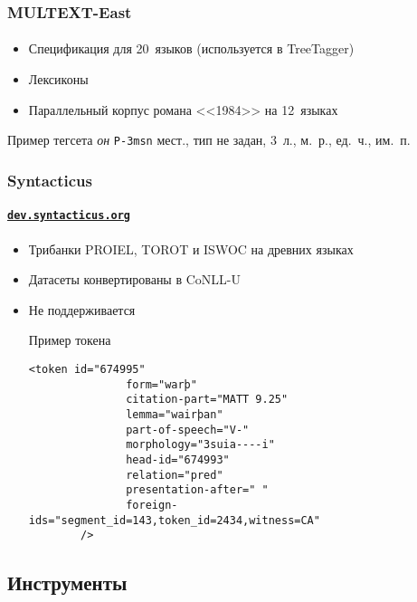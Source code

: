\begin{frame}
    \frametitle{MULTEXT-East}
    \framesubtitle{\autocite{multext_east}}

    \begin{itemize}
        \item Спецификация для 20~языков (используется в TreeTagger)
        \item Лексиконы
        \item Параллельный корпус романа <<1984>> на 12~языках
    \end{itemize}

    \vfill

    \begin{block}{Пример тегсета}
        \textit{он} \linebreak \texttt{P-3msn} \linebreak мест., тип не задан, 3~л., м.~р., ед.~ч., им.~п.
    \end{block}
\end{frame}

\begin{frame}[fragile]
    \frametitle{Syntacticus}
    \framesubtitle{\href{http://dev.syntacticus.org/}{\texttt{dev.syntacticus.org}}}

    \begin{itemize}
        \item Трибанки PROIEL, TOROT и ISWOC на древних языках
        \item Датасеты конвертированы в CoNLL-U
        \item Не поддерживается

    \begin{block}{Пример токена}
        \begin{Verbatim}[fontsize=\scriptsize, gobble=8]
        <token id="674995"
               form="warþ"
               citation-part="MATT 9.25"
               lemma="wairþan"
               part-of-speech="V-"
               morphology="3suia----i"
               head-id="674993"
               relation="pred"
               presentation-after=" "
               foreign-ids="segment_id=143,token_id=2434,witness=CA"
        />
        \end{Verbatim}
    \end{block}
    \end{itemize}
\end{frame}

\subsection{Инструменты}

